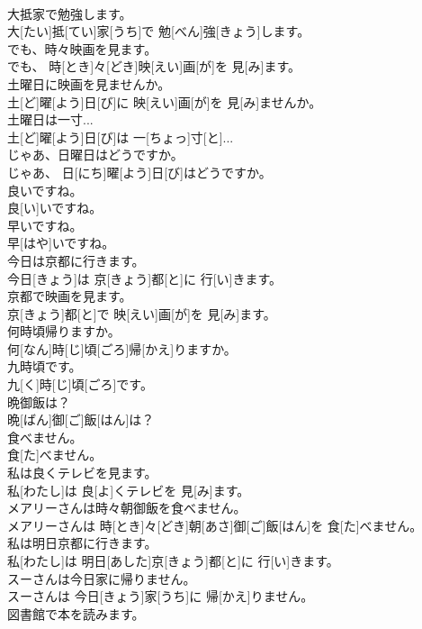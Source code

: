 \documentclass[8pt]{extreport}
\begin{document}
\begin{CJK}{UTF8}{min}
\\	大抵家で勉強します。	
\\	大[たい]抵[てい]家[うち]で 勉[べん]強[きょう]します。
\\	でも、時々映画を見ます。	
\\	でも、 時[とき]々[どき]映[えい]画[が]を 見[み]ます。
\\	土曜日に映画を見ませんか。	
\\	土[ど]曜[よう]日[び]に 映[えい]画[が]を 見[み]ませんか。
\\	土曜日は一寸...	
\\	土[ど]曜[よう]日[び]は 一[ちょっ]寸[と]...
\\	じゃあ、日曜日はどうですか。	
\\	じゃあ、 日[にち]曜[よう]日[び]はどうですか。
\\	良いですね。	
\\	良[い]いですね。
\\	早いですね。	
\\	早[はや]いですね。
\\	今日は京都に行きます。	
\\	今日[きょう]は 京[きょう]都[と]に 行[い]きます。
\\	京都で映画を見ます。	
\\	京[きょう]都[と]で 映[えい]画[が]を 見[み]ます。
\\	何時頃帰りますか。	
\\	何[なん]時[じ]頃[ごろ]帰[かえ]りますか。
\\	九時頃です。	
\\	九[く]時[じ]頃[ごろ]です。
\\	晩御飯は？	
\\	晩[ばん]御[ご]飯[はん]は？
\\	食べません。	
\\	食[た]べません。
\\	私は良くテレビを見ます。	
\\	私[わたし]は 良[よ]くテレビを 見[み]ます。
\\	メアリーさんは時々朝御飯を食べません。	
\\	メアリーさんは 時[とき]々[どき]朝[あさ]御[ご]飯[はん]を 食[た]べません。
\\	私は明日京都に行きます。	
\\	私[わたし]は 明日[あした]京[きょう]都[と]に 行[い]きます。
\\	スーさんは今日家に帰りません。	
\\	スーさんは 今日[きょう]家[うち]に 帰[かえ]りません。
\\	図書館で本を読みます。	

\end{CJK}
\end{document}
